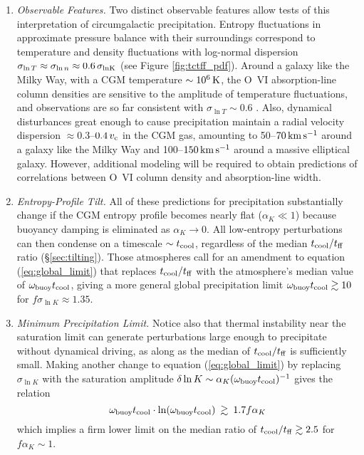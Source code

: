 \documentclass[twocolumn]{aastex63}
\begin{document}
\begin{enumerate}
    \item \textit{Observable Features.}  Two distinct observable features allow tests of this interpretation of circumgalactic precipitation.  Entropy fluctuations in approximate pressure balance with their surroundings correspond to temperature and density fluctuations with log-normal dispersion $\sigma_{\ln T} \approx \sigma_{\ln n} \approx 0.6 \, \sigma_{\rm ln K}$ (see Figure \ref{fig:tctff_pdf}).  Around a galaxy like the Milky Way, with a CGM temperature $\sim 10^6 \, {\rm K}$, the O~VI absorption-line column densities are sensitive to the amplitude of temperature fluctuations, and observations are so far consistent with $\sigma_{\ln T} \sim 0.6$ \citep{Voit_2019ApJ...880..139V}.  Also, dynamical disturbances great enough to cause precipitation maintain a radial velocity dispersion $\approx 0.3$--$0.4 \, v_{\rm c}$ in the CGM gas, amounting to 50--$70 \, {\rm km \, s^{-1}}$ around a galaxy like the Milky Way and 100--$150 \, {\rm km \, s^{-1}}$ around a massive elliptical galaxy.  However, additional modeling will be required to obtain predictions of correlations between O~VI column density and absorption-line width.
    
    \item \textit{Entropy-Profile Tilt.}  All of these predictions for precipitation substantially change if the CGM entropy profile becomes nearly flat ($\alpha_K \ll 1$) because buoyancy damping is eliminated as $\alpha_K \rightarrow 0$. All low-entropy perturbations can then condense on a timescale $\sim t_{\rm cool}$, regardless of the median $t_{\rm cool} / t_{\rm ff}$ ratio (\S \ref{sec:tilting}).  Those atmospheres call for an amendment to equation (\ref{eq:global_limit}) that replaces $t_{\rm cool} / t_{\rm ff}$ with the atmosphere's median value of $\omega_{\rm buoy} t_{\rm cool}$, giving a more general global precipitation limit $\omega_{\rm buoy} t_{\rm cool} \gtrsim 10$ for $f \sigma_{\ln K} \approx 1.35$. 
     
     \newpage
     
    \item \textit{Minimum Precipitation Limit.}  Notice also that thermal instability near the saturation limit can generate perturbations large enough to precipitate without dynamical driving, as along as the median of $t_{\rm cool}/t_{\rm ff}$ is sufficiently small.  Making another change to equation (\ref{eq:global_limit}) by replacing $\sigma_{\ln K}$ with the saturation amplitude $\delta \ln K \sim \alpha_K (\omega_{\rm buoy} t_{\rm cool})^{-1}$ gives the relation
    \begin{equation}
      \omega_{\rm buoy} t_{\rm cool} \cdot  
        \ln ( \omega_{\rm buoy} t_{\rm cool} ) 
          \: \gtrsim \: 1.7 f \alpha_K    
    \end{equation}
    which implies a firm lower limit on the median ratio of $t_{\rm cool} / t_{\rm ff} \gtrsim 2.5$ for $f \alpha_K \sim 1$. 
\end{enumerate}
\end{document}
